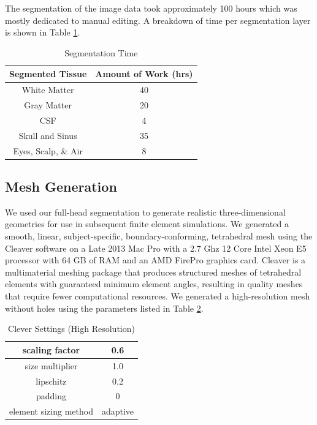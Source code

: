 The segmentation of the image data took approximately 100 hours which was mostly dedicated to manual editing. A breakdown of time per segmentation layer is shown in Table \ref{tab:seg}.

\begin{table}[H]
\centering
\caption{Segmentation Time}
\label{tab:seg}
\begin{tabular}{|c|c|}
\hline
Segmented Tissue    & Amount of Work (hrs) \\ \hline
White Matter       & 40                   \\ \hline
Gray Matter         & 20                   \\ \hline
CSF                 & 4                    \\ \hline
Skull and Sinus     & 35                   \\ \hline
Eyes, Scalp, \& Air & 8                    \\ \hline
\end{tabular}
\end{table}

\subsection{Mesh Generation}
\label{sec:mesh}


We used our full-head segmentation to generate realistic three-dimensional geometries for use in subsequent finite element simulations. We generated a smooth, linear, subject-specific, boundary-conforming, tetrahedral mesh using the Cleaver software \cite{ref:cleaver} on a Late 2013 Mac Pro with a 2.7 Ghz 12 Core Intel Xeon E5 processor with 64 GB of RAM and an AMD FirePro graphics card. Cleaver is a multimaterial meshing package that produces structured meshes of tetrahedral elements with guaranteed minimum element angles, resulting in quality meshes that require fewer computational resources. We generated a high-resolution mesh without holes using the parameters listed in Table \ref{tab:cleaver}.

\begin{table}[H]
\centering
\caption{Clever Settings (High Resolution)}
\label{tab:cleaver}
\begin{tabular}{|c|c|}
\hline
scaling factor                    & 0.6                 \\ \hline
size multiplier                   & 1.0                 \\ \hline
lipschitz                         & 0.2                 \\ \hline
padding                           & 0                   \\ \hline
element sizing method             & adaptive            \\ \hline
\end{tabular}
\end{table}


